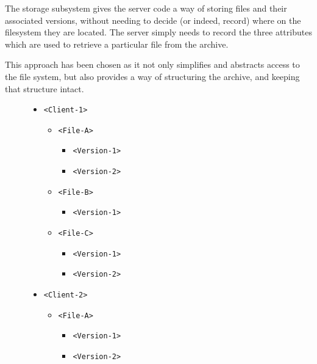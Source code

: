 The storage subsystem gives the server code a way of storing files and their
associated versions, without needing to decide (or indeed, record) where on the
filesystem they are located. The server simply needs to record the three
attributes which are used to retrieve a particular file from the archive.

This approach has been chosen as it not only simplifies and abstracts access to
the file system, but also provides a way of structuring the archive, and
keeping that structure intact.

\begin{figure}[H]
    \begin{itemize}
        \setlength{\parskip}{0ex}
        \item \verb!<Client-1>!
            \begin{itemize}
                \item \verb!<File-A>!
                    \begin{itemize}
                        \item \verb!<Version-1>!
                        \item \verb!<Version-2>!
                    \end{itemize}
                \item \verb!<File-B>!
                    \begin{itemize}
                        \item \verb!<Version-1>!
                    \end{itemize}
                \item \verb!<File-C>!
                    \begin{itemize}
                        \item \verb!<Version-1>!
                        \item \verb!<Version-2>!
                    \end{itemize}
            \end{itemize}
        \item \verb!<Client-2>!
            \begin{itemize}
                \item \verb!<File-A>!
                    \begin{itemize}
                        \item \verb!<Version-1>!
                        \item \verb!<Version-2>!
                    \end{itemize}

\end{itemize}
\end{itemize}
\end{figure}
